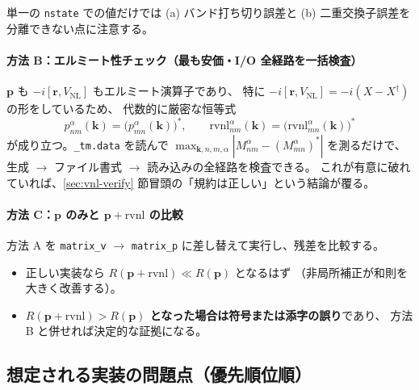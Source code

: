 \documentclass[dvipdfmx,a4paper,11pt]{jsarticle}
\newcommand{\file}[1]{\texttt{#1}}
\newcommand{\vk}{\bm{k}}
\newcommand{\vp}{\bm{p}}
\newcommand{\vr}{\bm{r}}
\begin{document}
単一の \file{nstate} での値だけでは
(a) バンド打ち切り誤差と (b) 二重交換子誤差を分離できない点に注意する。

\paragraph{方法 B：エルミート性チェック（最も安価・I/O 全経路を一括検査）}
$\vp$ も $-i[\vr,V_{\mathrm{NL}}]$ もエルミート演算子であり、
特に $-i[\vr,V_{\mathrm{NL}}] = -i(X - X^\dagger)$ の形をしているため、
代数的に厳密な恒等式
%
\begin{equation}
  p_{nm}^\alpha(\vk) = \bigl(p_{mn}^\alpha(\vk)\bigr)^{\!*},
  \qquad
  \mathrm{rvnl}_{nm}^\alpha(\vk) = \bigl(\mathrm{rvnl}_{mn}^\alpha(\vk)\bigr)^{\!*}
  \label{eq:hermiticity-check}
\end{equation}
%
が成り立つ。\file{\_tm.data} を読んで
$\max_{\vk,n,m,\alpha} |M_{nm}^\alpha - (M_{mn}^\alpha)^*|$ を測るだけで、
生成 $\to$ ファイル書式 $\to$ 読み込みの全経路を検査できる。
これが有意に破れていれば、\ref{sec:vnl-verify} 節冒頭の「規約は正しい」という結論が覆る。

\paragraph{方法 C：$\vp$ のみと $\vp + \mathrm{rvnl}$ の比較}
方法 A を \verb|matrix_v| $\to$ \verb|matrix_p| に差し替えて実行し、残差を比較する。
\begin{itemize}
\item 正しい実装なら $R(\vp+\mathrm{rvnl}) \ll R(\vp)$ となるはず
      （非局所補正が和則を大きく改善する）。
\item \textbf{$R(\vp+\mathrm{rvnl}) > R(\vp)$ となった場合は符号または添字の誤り}であり、
      方法 B と併せれば決定的な証拠になる。
\end{itemize}

\subsection{想定される実装の問題点（優先順位順）}
\end{document}
